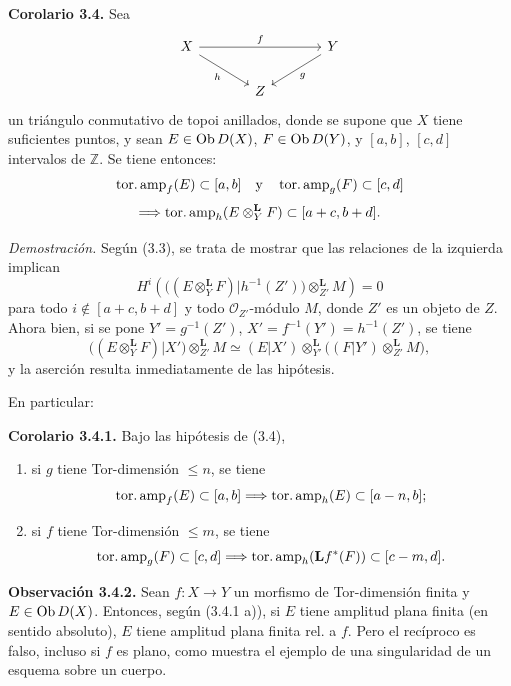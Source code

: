 \providecommand{\sisi}[2]{#2}

\textbf{Corolario 3.4.} Sea
\[
\begin{tikzcd}[column sep=large]
X \arrow[rr,"f"] \arrow[dr,"h"'] & & Y \arrow[dl,"g"]\\
& Z &
\end{tikzcd}
\]
un triángulo conmutativo de topoi anillados, donde se supone que \(X\) tiene suficientes puntos, y sean \(E\in\operatorname{Ob} D(X)\), \(F\in\operatorname{Ob} D(Y)\), y \([a,b]\), \([c,d]\) intervalos de \(\mathbb Z\). Se tiene entonces:
\[
  \operatorname{tor.amp}_f(E)\subset[a,b]\quad\text{y}\quad\operatorname{tor.amp}_g(F)\subset[c,d]
\]
\[
  \Longrightarrow\operatorname{tor.amp}_h(E\otimes_Y^{\mathbf L}F)\subset[a+c,b+d].
\]

\emph{Demostración.} Según (3.3), se trata de mostrar que las relaciones de la izquierda implican
\[
  H^i\left(\bigl((E\otimes_Y^{\mathbf L}F)|h^{-1}(Z')\bigr)
  \otimes_{Z'}^{\mathbf L}M\right)=0
\]
para todo \(i\notin[a+c,b+d]\) y todo \(\mathcal O_{Z'}\)-módulo \(M\), donde \(Z'\) es un objeto de \(Z\). Ahora bien, si se pone \(Y'=g^{-1}(Z')\), \(X'=f^{-1}(Y')=h^{-1}(Z')\), se tiene
\[
  \bigl((E\otimes_Y^{\mathbf L}F)|X'\bigr)
  \otimes_{Z'}^{\mathbf L}M
  \simeq
  (E|X')\otimes_{Y'}^{\mathbf L}
  \bigl((F|Y')\otimes_{Z'}^{\mathbf L}M\bigr),
\]
y la aserción resulta inmediatamente de las hipótesis.

En particular:

\textbf{Corolario 3.4.1.} Bajo las hipótesis de (3.4),
\begin{enumerate}[label=\alph*)]
\item si \(g\) tiene Tor-dimensión \(\leq n\), se tiene
\[
  \operatorname{tor.amp}_f(E)\subset[a,b]\Longrightarrow\operatorname{tor.amp}_h(E)\subset[a-n,b];
\]
\item si \(f\) tiene Tor-dimensión \(\leq m\), se tiene
\[
  \operatorname{tor.amp}_g(F)\subset[c,d]\Longrightarrow\operatorname{tor.amp}_h(\mathbf Lf^*(F))\subset[c-m,d].
\]
\end{enumerate}

\textbf{Observación 3.4.2.} Sean \(f:X\to Y\) un morfismo de Tor-dimensión finita y \(E\in\operatorname{Ob} D(X)\). Entonces, según (3.4.1 a)), si \(E\) tiene amplitud plana finita (en sentido absoluto), \(E\) tiene amplitud plana finita rel. a \(f\). Pero el recíproco es falso, incluso si \(f\) es plano, como muestra el ejemplo de una singularidad de un esquema sobre un cuerpo.

